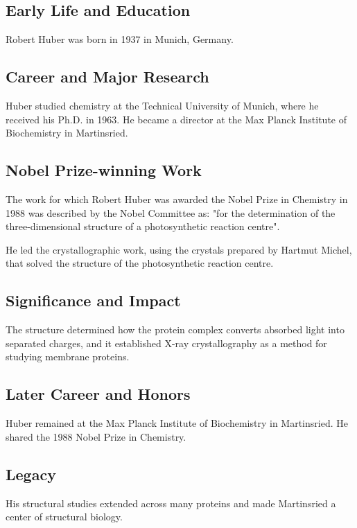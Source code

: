 \subsection*{Early Life and Education}

Robert Huber was born in 1937 in Munich, Germany.

\subsection*{Career and Major Research}

Huber studied chemistry at the Technical University of Munich, where he received his Ph.D. in 1963. He became a director at the Max Planck Institute of Biochemistry in Martinsried.

\subsection*{Nobel Prize-winning Work}

The work for which Robert Huber was awarded the Nobel Prize in Chemistry in 1988 was described by the Nobel Committee as: "for the determination of the three-dimensional structure of a photosynthetic reaction centre".

He led the crystallographic work, using the crystals prepared by Hartmut Michel, that solved the structure of the photosynthetic reaction centre.

\subsection*{Significance and Impact}

The structure determined how the protein complex converts absorbed light into separated charges, and it established X-ray crystallography as a method for studying membrane proteins.

\subsection*{Later Career and Honors}

Huber remained at the Max Planck Institute of Biochemistry in Martinsried. He shared the 1988 Nobel Prize in Chemistry.

\subsection*{Legacy}

His structural studies extended across many proteins and made Martinsried a center of structural biology.

